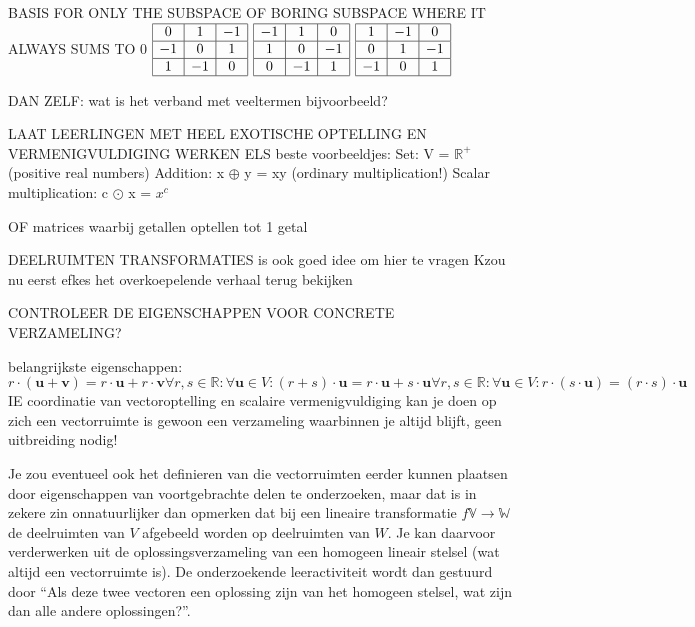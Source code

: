 \documentclass{ximera}
\begin{document}
BASIS FOR ONLY THE SUBSPACE OF BORING SUBSPACE WHERE IT ALWAYS SUMS TO
0
\(
\begin{array}{|c|c|c|}
\hline
0 & 1 & -1 \\
\hline
-1 & 0 & 1 \\
\hline
1 & -1 & 0 \\
\hline
\end{array}
\)
\(
\begin{array}{|c|c|c|}
\hline
-1 & 1 & 0 \\
\hline
1 & 0 & -1 \\
\hline
0 & -1 & 1 \\
\hline
\end{array}
\)
\(
\begin{array}{|c|c|c|}
\hline
1 & -1 & 0 \\
\hline
0 & 1 & -1 \\
\hline
-1 & 0 & 1 \\
\hline
\end{array}
\)

DAN ZELF: wat is het verband met veeltermen bijvoorbeeld?

LAAT LEERLINGEN MET HEEL EXOTISCHE OPTELLING EN VERMENIGVULDIGING WERKEN
ELS beste voorbeeldjes:
Set: V = $\mathbb{R}^{+}$ (positive real numbers)
Addition: x $\oplus$ y = xy (ordinary multiplication!)
Scalar multiplication: c $\odot$ x = $x^c$

OF matrices waarbij getallen optellen tot 1 getal

DEELRUIMTEN TRANSFORMATIES is ook goed idee om hier te vragen
Kzou nu eerst efkes het overkoepelende verhaal terug bekijken


CONTROLEER DE EIGENSCHAPPEN VOOR CONCRETE VERZAMELING?

belangrijkste eigenschappen:
$$
r\cdot (\mathbf{u}+\mathbf{v})=r\cdot \mathbf{u}+r\cdot \mathbf{v}
\forall r,s\in \mathbb{R}:\forall \mathbf{u} \in V:(r+s)\cdot \mathbf{u}=r\cdot \mathbf{u}+s \cdot \mathbf{u}
\forall r,s\in \mathbb{R}:\forall \mathbf{u} \in V:r\cdot (s\cdot \mathbf{u})=(r\cdot s) \cdot \mathbf{u}
$$
IE coordinatie van vectoroptelling en scalaire vermenigvuldiging
kan je doen op zich
een vectorruimte is gewoon een verzameling waarbinnen je altijd blijft, geen uitbreiding nodig!

Je zou eventueel ook het definieren van die vectorruimten eerder kunnen plaatsen door eigenschappen van voortgebrachte delen te onderzoeken, maar dat is in zekere zin onnatuurlijker dan opmerken dat bij een lineaire transformatie \(f \mathbb{V} \to \mathbb{W}\) de deelruimten van \(V\) afgebeeld worden op deelruimten van \(W\).
Je kan daarvoor verderwerken uit de oplossingsverzameling van een homogeen lineair stelsel (wat altijd een vectorruimte is).
De onderzoekende leeractiviteit wordt dan gestuurd door ``Als deze twee vectoren een oplossing zijn van het homogeen stelsel, wat zijn dan alle andere oplossingen?''.
\end{document}
